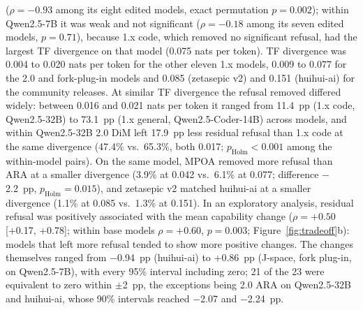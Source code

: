 ($\rho=-0.93$ among its eight edited models, exact permutation $p=0.002$); within Qwen2.5-7B it was weak and not
significant ($\rho=-0.18$ among its seven edited models, $p=0.71$), because 1.x code, which removed no significant
refusal, had the largest TF divergence on that model (0.075 nats per token). TF divergence was 0.004 to 0.020 nats
per token for the other eleven 1.x models, 0.009 to 0.077 for the 2.0 and fork-plug-in models and 0.085 (zetasepic
v2) and 0.151 (huihui-ai) for the community releases. At similar TF divergence the refusal removed differed widely:
between 0.016 and 0.021 nats per token it ranged from 11.4~pp (1.x code, Qwen2.5-32B) to 73.1~pp (1.x general,
Qwen2.5-Coder-14B) across models, and within Qwen2.5-32B 2.0 DiM left 17.9~pp less residual refusal than 1.x code at
the same divergence (47.4\% vs.\ 65.3\%, both 0.017; $p_\mathrm{Holm}<0.001$ among the within-model pairs). On the
same model, MPOA removed more refusal than ARA at a smaller divergence (3.9\% at 0.042 vs.\ 6.1\% at 0.077; difference
$-$2.2~pp, $p_\mathrm{Holm}=0.015$), and zetasepic v2 matched huihui-ai at a smaller divergence (1.1\% at 0.085 vs.\
1.3\% at 0.151). In an exploratory analysis, residual refusal was positively associated with the mean capability change
($\rho=+0.50$ [+0.17, +0.78]; within base models $\rho=+0.60$, $p=0.003$; Figure~\ref{fig:tradeoff}b): models that
left more refusal tended to show more positive changes.
The changes themselves ranged from $-$0.94~pp (huihui-ai) to +0.86~pp (J-space, fork plug-in, on Qwen2.5-7B), with
every 95\% interval including zero; 21 of the 23 were equivalent to zero within $\pm$2~pp, the exceptions being 2.0
ARA on Qwen2.5-32B and huihui-ai, whose 90\% intervals reached $-$2.07 and $-$2.24~pp.

